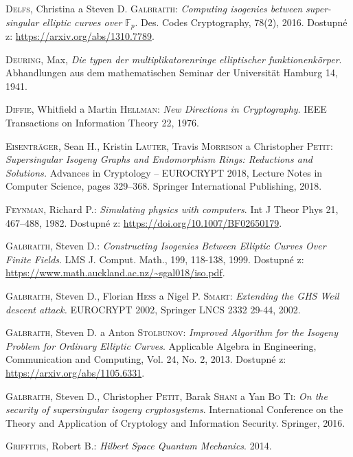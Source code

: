 \documentclass[12pt]{report}
\begin{document}
\begin{thebibliography}{97}
\textsc{Delfs}, Christina a Steven D. \textsc{Galbraith}: \textit{Computing isogenies between super-singular elliptic curves over} $\mathbb{F}_p$. Des. Codes Cryptography, 78(2), 2016. Dostupné z: \url{https://arxiv.org/abs/1310.7789}.

\textsc{Deuring}, Max, \textit{Die typen der multiplikatorenringe elliptischer funktionenkörper}. Abhandlungen aus dem mathematischen Seminar der Universität Hamburg 14, 1941. 

\textsc{Diffie}, Whitfield a Martin \textsc{Hellman}: \textit{New Directions in Cryptography}. IEEE Transactions on Information Theory 22, 1976.

\textsc{Eisentr{\"a}ger}, Sean H., Kristin \textsc{Lauter}, Travis \textsc{Morrison} a Christopher \textsc{Petit}: \textit{Supersingular Isogeny Graphs and Endomorphism Rings: Reductions and Solutions.}
Advances in Cryptology – EUROCRYPT 2018, Lecture Notes in Computer Science, pages 329–368. Springer International Publishing, 2018.

\textsc{Feynman}, Richard P.: \textit{Simulating physics with computers}. Int J Theor Phys 21, 467–488, 1982. Dostupné z: \url{https://doi.org/10.1007/BF02650179}.

\textsc{Galbraith}, Steven D.: \textit{Constructing Isogenies Between Elliptic Curves Over Finite Fields}. LMS J. Comput. Math., 199, 118-138, 1999. Dostupné z: \url{https://www.math.auckland.ac.nz/~sgal018/iso.pdf}.

\textsc{Galbraith}, Steven D., Florian \textsc{Hess} a Nigel P. \textsc{Smart}: \textit{Extending the GHS Weil descent attack.} EUROCRYPT 2002,  Springer LNCS 2332 29-44, 2002.

\textsc{Galbraith}, Steven D. a Anton \textsc{Stolbunov}: \textit{Improved Algorithm for the Isogeny Problem for Ordinary Elliptic Curves}. Applicable Algebra in Engineering, Communication and Computing, Vol. 24, No. 2, 2013. Dostupné z: \url{https://arxiv.org/abs/1105.6331}.

\textsc{Galbraith}, Steven D., Christopher \textsc{Petit}, Barak \textsc{Shani} a Yan \textsc{Bo Ti}: \textit{On the security of supersingular isogeny cryptosystems}. International Conference on the Theory and Application of Cryptology and Information Security. Springer, 2016.

\textsc{Griffiths}, Robert B.: \textit{Hilbert Space Quantum Mechanics}. 2014.


\end{thebibliography}
\end{document}
